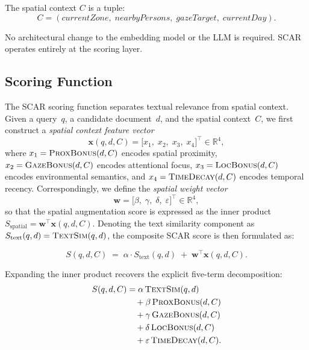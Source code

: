 \documentclass[journal]{IEEEtran}
\begin{document}
\noindent
The spatial context $C$ is a tuple:
\begin{equation}
  C = (\textit{currentZone},\;
       \textit{nearbyPersons},\;
       \textit{gazeTarget},\;
       \textit{currentDay}).
  \label{eq:context}
\end{equation}

\noindent
No architectural change to the embedding model or the LLM is
required.  SCAR operates entirely at the scoring layer.

\subsection{Scoring Function}
\label{ssec:scoring}

The SCAR scoring function separates textual relevance from spatial
context.  Given a query~$q$, a candidate document~$d$,
and the spatial context~$C$, we first construct a
\emph{spatial context feature vector}
\begin{equation}
  \mathbf{x}(q,d,C)
  = \bigl[x_1,\; x_2,\; x_3,\; x_4\bigr]^\top
  \in \mathbb{R}^4,
  \label{eq:feature_vec}
\end{equation}
where $x_1 = \textsc{ProxBonus}(d,C)$ encodes spatial proximity,
$x_2 = \textsc{GazeBonus}(d,C)$ encodes attentional focus,
$x_3 = \textsc{LocBonus}(d,C)$ encodes environmental semantics, and
$x_4 = \textsc{TimeDecay}(d,C)$ encodes temporal recency.
Correspondingly, we define the \emph{spatial weight vector}
\begin{equation}
  \mathbf{w}
  = \bigl[\beta,\; \gamma,\; \delta,\; \varepsilon\bigr]^\top
  \in \mathbb{R}^4,
  \label{eq:weight_vec}
\end{equation}
so that the spatial augmentation score is expressed as the inner
product $S_{\mathrm{spatial}} = \mathbf{w}^\top \mathbf{x}(q,d,C)$.
Denoting the text similarity component as
$S_{\mathrm{text}}(q,d) = \textsc{TextSim}(q,d)$,
the composite SCAR score is then formulated as:

\begin{equation}
  S(q,d,C)
  \;=\;
  \alpha \cdot S_{\mathrm{text}}(q,d)
  \;+\;
  \mathbf{w}^\top \mathbf{x}(q,d,C).
  \label{eq:scar_score}
\end{equation}

\noindent
Expanding the inner product recovers the explicit five-term
decomposition:
\begin{align}
  S(q,d,C) &= \alpha\,\textsc{TextSim}(q,d) \notag \\
  &\quad + \beta\,\textsc{ProxBonus}(d,C) \notag \\
  &\quad + \gamma\,\textsc{GazeBonus}(d,C) \notag \\
  &\quad + \delta\,\textsc{LocBonus}(d,C) \notag \\
  &\quad + \varepsilon\,\textsc{TimeDecay}(d,C).
  \label{eq:scar_score_expanded}
\end{align}
\end{document}
